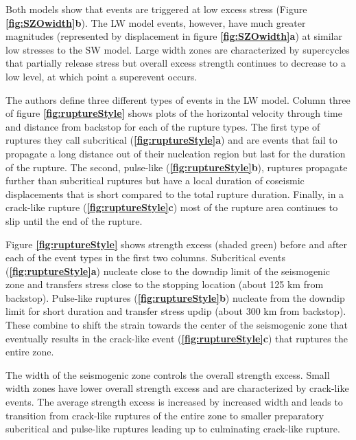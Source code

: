 \documentclass[]{proposalnsf}
\begin{document}
Both models show that events are triggered at low excess stress (Figure {\bf \ref{fig:SZOwidth}b}). The LW model events, however, have much greater magnitudes (represented by displacement in figure {\bf \ref{fig:SZOwidth}a}) at similar low stresses to the SW model. Large width zones are characterized by supercycles that partially release stress but overall excess strength continues to decrease to a low level, at which point a superevent occurs. 

The authors define three different types of events in the LW model. Column three of figure {\bf \ref{fig:ruptureStyle}} shows plots of the horizontal velocity through time and distance from backstop for each of the rupture types. The first type of ruptures they call subcritical ({\bf \ref{fig:ruptureStyle}a}) and are events that fail to propagate a long distance out of their nucleation region but last for the duration of the rupture. The second, pulse-like ({\bf \ref{fig:ruptureStyle}b}), ruptures propagate further than subcritical ruptures but have a local duration of coseismic displacements that is short compared to the total rupture duration. Finally, in a crack-like rupture ({\bf \ref{fig:ruptureStyle}c}) most of the rupture area continues to slip until the end of the rupture. 

Figure {\bf \ref{fig:ruptureStyle}} shows strength excess (shaded green) before and after each of the event types in the first two columns. Subcritical events ({\bf \ref{fig:ruptureStyle}a}) nucleate close to the downdip limit of the seismogenic zone and transfers stress close to the stopping location (about 125 km from backstop). Pulse-like ruptures ({\bf \ref{fig:ruptureStyle}b}) nucleate from the downdip limit for short duration and transfer stress updip (about 300 km from backstop). These combine to shift the strain towards the center of the seismogenic zone that eventually results in the crack-like event ({\bf \ref{fig:ruptureStyle}c}) that ruptures the entire zone. 

The width of the seismogenic zone controls the overall strength excess. Small width zones have lower overall strength excess and are characterized by crack-like events. The average strength excess is increased by increased width and leads to transition from crack-like ruptures of the entire zone to smaller preparatory subcritical and pulse-like ruptures leading up to culminating crack-like rupture. 

\end{document}
